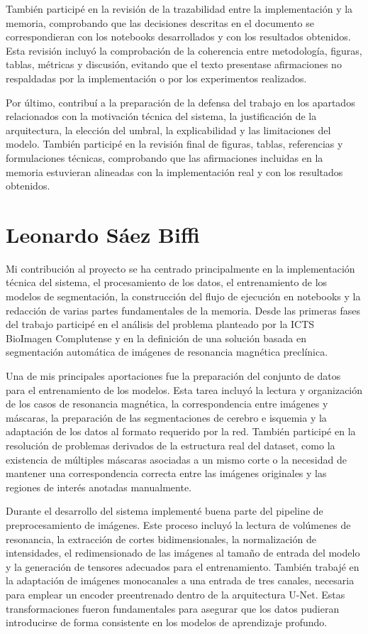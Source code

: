 También participé en la revisión de la trazabilidad entre la implementación y la memoria, comprobando que las decisiones descritas en el documento se correspondieran con los notebooks desarrollados y con los resultados obtenidos. Esta revisión incluyó la comprobación de la coherencia entre metodología, figuras, tablas, métricas y discusión, evitando que el texto presentase afirmaciones no respaldadas por la implementación o por los experimentos realizados.

Por último, contribuí a la preparación de la defensa del trabajo en los apartados relacionados con la motivación técnica del sistema, la justificación de la arquitectura, la elección del umbral, la explicabilidad y las limitaciones del modelo. También participé en la revisión final de figuras, tablas, referencias y formulaciones técnicas, comprobando que las afirmaciones incluidas en la memoria estuvieran alineadas con la implementación real y con los resultados obtenidos.

\section*{Leonardo Sáez Biffi}

Mi contribución al proyecto se ha centrado principalmente en la implementación técnica del sistema, el procesamiento de los datos, el entrenamiento de los modelos de segmentación, la construcción del flujo de ejecución en notebooks y la redacción de varias partes fundamentales de la memoria. Desde las primeras fases del trabajo participé en el análisis del problema planteado por la ICTS BioImagen Complutense y en la definición de una solución basada en segmentación automática de imágenes de resonancia magnética preclínica.

Una de mis principales aportaciones fue la preparación del conjunto de datos para el entrenamiento de los modelos. Esta tarea incluyó la lectura y organización de los casos de resonancia magnética, la correspondencia entre imágenes y máscaras, la preparación de las segmentaciones de cerebro e isquemia y la adaptación de los datos al formato requerido por la red. También participé en la resolución de problemas derivados de la estructura real del dataset, como la existencia de múltiples máscaras asociadas a un mismo corte o la necesidad de mantener una correspondencia correcta entre las imágenes originales y las regiones de interés anotadas manualmente.

Durante el desarrollo del sistema implementé buena parte del pipeline de preprocesamiento de imágenes. Este proceso incluyó la lectura de volúmenes de resonancia, la extracción de cortes bidimensionales, la normalización de intensidades, el redimensionado de las imágenes al tamaño de entrada del modelo y la generación de tensores adecuados para el entrenamiento. También trabajé en la adaptación de imágenes monocanales a una entrada de tres canales, necesaria para emplear un encoder preentrenado dentro de la arquitectura U-Net. Estas transformaciones fueron fundamentales para asegurar que los datos pudieran introducirse de forma consistente en los modelos de aprendizaje profundo.

